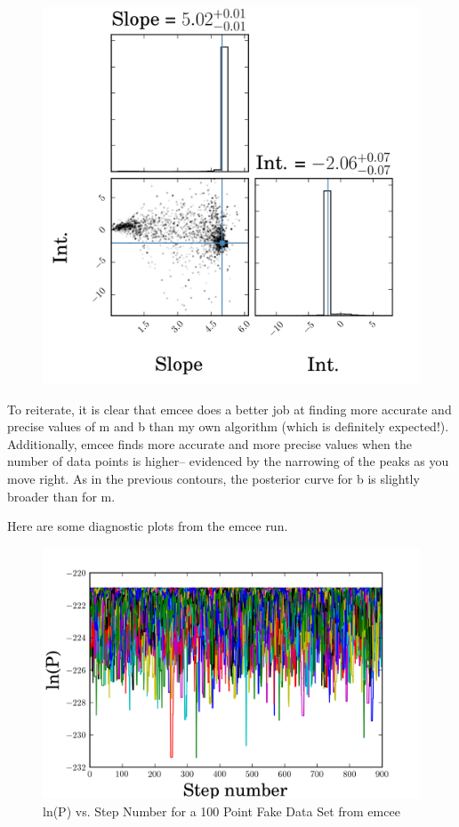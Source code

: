 \documentclass[english,12pt]{article}
\begin{document}
\begin{figure}[H]
\endminipage\hfill
{}%
  \includegraphics[width=\linewidth]{corner_1000_data_points_emcee.png}
\endminipage\hfill
\end{figure}

To reiterate, it is clear that emcee does a better job at finding more accurate and precise values of m and b than my own algorithm (which is definitely expected!). Additionally, emcee finds more accurate  and more precise values when the number of data points is higher-- evidenced by the narrowing of the peaks as you move right. As in the previous contours, the posterior curve for b is slightly broader than for m. 

Here are some diagnostic plots from the emcee run.


\begin{figure}[H]
\centering
\caption{ln(P) vs. Step Number for a 100 Point Fake Data Set from emcee}
\includegraphics[scale = 0.6]{lnp_step_100_emcee.png}
\end{figure}
\end{document}
